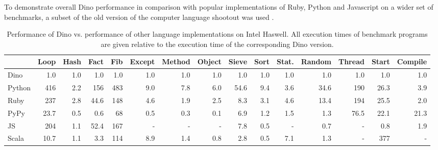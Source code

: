 \documentclass[preprint]{sigplanconf}
\begin{document}
  To demonstrate overall Dino performance in comparison with popular
implementations of Ruby, Python and Javascript on a wider set of benchmarks,
a subset of the old version of the computer language shootout was used \cite{Benchmarks}.

\begin{center}
\begin{table}[ht]
\begin{center}
\begin{tabular}{|l|r|r|r||r|r|r|r|r|r|r|r|r|r|r|}
\hline
  
        &Loop   &Hash&Fact   &Fib    &Except&Method&Object&Sieve&Sort &Stat.&Random &Thread&Start&Compile \\ \hline
Dino    &1.0    &1.0 &1.0    &1.0    &1.0   &1.0   &1.0   & 1.0 &1.0    &1.0  &1.0    &1.0   & 1.0 & 1.0   \\
Python  &416    &2.2 &156    &483    &9.0   &7.8   &6.0   &54.6 &9.4    &3.6  &34.6   &190   &26.3 &  3.9  \\
Ruby    &237    &2.8 &44.6   &148    &4.6   &1.9   &2.5   &  8.3&3.1    &4.6  &13.4   &194   &25.5 &  2.0  \\
PyPy    &23.7   &0.5 & 0.6   &  68   &0.5   &0.3   &0.1   &  6.9&1.2    &1.5  &  1.3  &76.5  &22.1 &21.3   \\
JS      &204    &1.1 &52.4   &167    &   -  &   -  &  -   &  7.8&0.5    &  -  &  0.7  &  -   &  0.8&  1.9  \\
Scala   &10.7   &1.1 & 3.3   &114    &8.9   &1.4   &0.8   &  2.8&0.5   &7.1  &  1.3  &  -   &377  &  -     \\ \hline

\end{tabular}
\end{center}
\caption{Performance of Dino vs. performance of other language implementations on Intel Haswell.  All execution times of benchmark programs are given relative to the execution time of the corresponding Dino version.}
\label{tab:x86-64}
\end{table}
\end{center}
\end{document}
